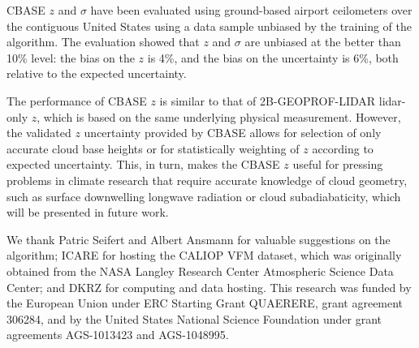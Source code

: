 \documentclass[essd,manuscript]{copernicus}\usepackage[]{graphicx}\usepackage[]{color}
\newcommand\CBH{\ensuremath{z}}
\begin{document}
CBASE \CBH{} and $\sigma$ have been evaluated using
ground-based airport ceilometers over the contiguous United States using a
data sample unbiased by the training of the algorithm.  The evaluation showed that
\CBH{} and $\sigma$ are unbiased at the better
than 10\% level: the bias on the \CBH{} is %
4\%,
and the bias on the uncertainty is %
6\%, both relative to the expected uncertainty.

The performance of CBASE \CBH{} is similar to that of 2B-GEOPROF-LIDAR
lidar-only \CBH{}, which is based on the same underlying physical measurement.
However, the validated \CBH{} uncertainty provided by CBASE allows for selection
of only accurate cloud base heights or for statistically weighting of \CBH{}
according to expected uncertainty.  This, in turn, makes the CBASE \CBH{} useful
for pressing problems in climate research that require accurate knowledge of
cloud geometry, such as surface downwelling longwave radiation or cloud
subadiabaticity, which will be presented in future work.

\begin{acknowledgements}
  We thank Patric Seifert and Albert Ansmann for valuable suggestions on the
  algorithm; ICARE for hosting the CALIOP VFM dataset, which was
  originally obtained from the NASA Langley Research Center Atmospheric Science
  Data Center; and DKRZ for computing and data hosting.  This research was
  funded by the European Union under ERC Starting Grant
  QUAERERE, grant agreement 306284, and by the United States National Science
  Foundation under grant agreements AGS-1013423 and AGS-1048995.
\end{acknowledgements}



\end{document}
